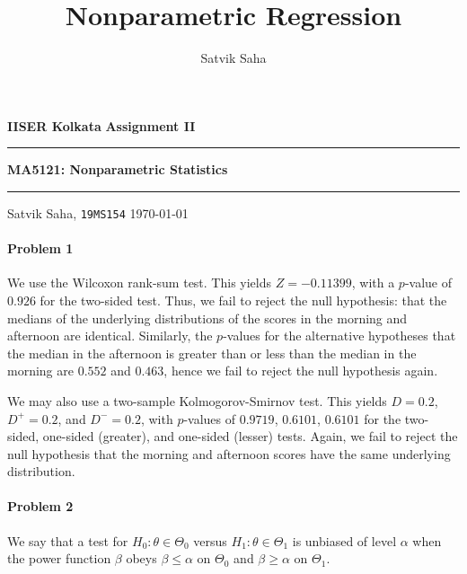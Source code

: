 \documentclass[10pt]{article}
\title{Nonparametric Regression}
\author{Satvik Saha}
\date{}
\begin{document}
    \noindent\textbf{IISER Kolkata} \hfill \textbf{Assignment II}
    \vspace{3pt}
    \hrule
    \vspace{3pt}
    \begin{center}
    \LARGE{\textbf{MA5121: Nonparametric Statistics}}
    \end{center}
    \vspace{3pt}
    \hrule
    \vspace{3pt}
    Satvik Saha, \texttt{19MS154} \hfill \today
    \vspace{20pt}

    \setlength{\parskip}{1em}



    \paragraph{Problem 1} We use the Wilcoxon rank-sum test. This yields $Z =
    -0.11399$, with a $p$-value of $0.926$ for the two-sided test. Thus, we
    fail to reject the null hypothesis: that the medians of the underlying
    distributions of the scores in the morning and afternoon are identical.
    Similarly, the $p$-values for the alternative hypotheses that the median
    in the afternoon is greater than or less than the median in the morning
    are $0.552$ and $0.463$, hence we fail to reject the null hypothesis
    again.

    We may also use a two-sample Kolmogorov-Smirnov test. This yields $D =
    0.2$, $D^+ = 0.2$, and $D^- = 0.2$, with $p$-values of $0.9719$, $0.6101$,
    $0.6101$ for the two-sided, one-sided (greater), and one-sided (lesser)
    tests. Again, we fail to reject the null hypothesis that the morning and
    afternoon scores have the same underlying distribution.


    \paragraph{Problem 2} We say that a test for $H_0: \theta \in \Theta_0$
    versus $H_1: \theta \in \Theta_1$ is unbiased of level $\alpha$ when the
    power function $\beta$ obeys $\beta \leq \alpha$ on $\Theta_0$ and $\beta
    \geq \alpha$ on $\Theta_1$.
\end{document}
